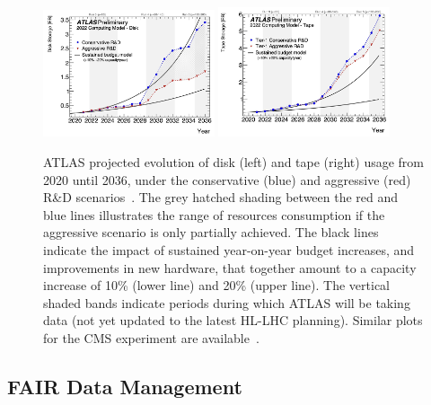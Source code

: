 \begin{figure}[htbp]
\begin{center}
\includegraphics[width=0.45\textwidth]{figures/Figure3a} 
\includegraphics[width=0.45\textwidth]{figures/Figure3b} \\ 
\caption{ATLAS projected evolution of disk (left) and tape (right) usage from 2020 until 2036, under the conservative (blue) and aggressive (red) R\&D scenarios~\cite{CERN-LHCC-2022-005}. The grey hatched shading between the red and blue lines illustrates the range of resources consumption if the aggressive scenario is only partially achieved. The black lines indicate the impact of sustained year-on-year budget increases, and improvements in new hardware, that together amount to a capacity increase of 10\% (lower line) and 20\% (upper line). The vertical shaded bands indicate periods during which ATLAS will be taking data (not yet updated to the latest HL-LHC planning). Similar plots for the CMS experiment are available~\cite{Software:2815292}.}
\label{figures:Fig3}
\end{center}
\end{figure}



\subsection{FAIR Data Management}


